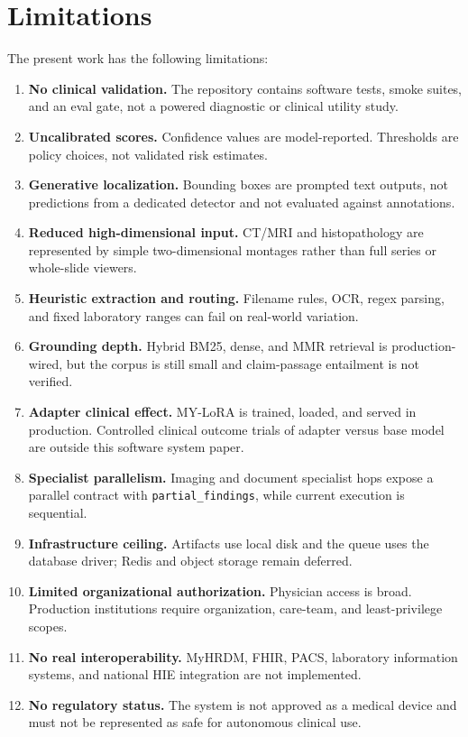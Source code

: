 \documentclass[conference]{IEEEtran}
\begin{document}
\section{Limitations}

The present work has the following limitations:

\begin{enumerate}
    \item \textbf{No clinical validation.} The repository contains software tests, smoke suites, and an eval gate, not a powered diagnostic or clinical utility study.
    \item \textbf{Uncalibrated scores.} Confidence values are model-reported. Thresholds are policy choices, not validated risk estimates.
    \item \textbf{Generative localization.} Bounding boxes are prompted text outputs, not predictions from a dedicated detector and not evaluated against annotations.
    \item \textbf{Reduced high-dimensional input.} CT/MRI and histopathology are represented by simple two-dimensional montages rather than full series or whole-slide viewers.
    \item \textbf{Heuristic extraction and routing.} Filename rules, OCR, regex parsing, and fixed laboratory ranges can fail on real-world variation.
    \item \textbf{Grounding depth.} Hybrid BM25, dense, and MMR retrieval is production-wired, but the corpus is still small and claim-passage entailment is not verified.
    \item \textbf{Adapter clinical effect.} MY-LoRA is trained, loaded, and served in production. Controlled clinical outcome trials of adapter versus base model are outside this software system paper.
    \item \textbf{Specialist parallelism.} Imaging and document specialist hops expose a parallel contract with \texttt{partial\_findings}, while current execution is sequential.
    \item \textbf{Infrastructure ceiling.} Artifacts use local disk and the queue uses the database driver; Redis and object storage remain deferred.
    \item \textbf{Limited organizational authorization.} Physician access is broad. Production institutions require organization, care-team, and least-privilege scopes.
    \item \textbf{No real interoperability.} MyHRDM, FHIR, PACS, laboratory information systems, and national HIE integration are not implemented.
    \item \textbf{No regulatory status.} The system is not approved as a medical device and must not be represented as safe for autonomous clinical use.
\end{enumerate}
\end{document}
